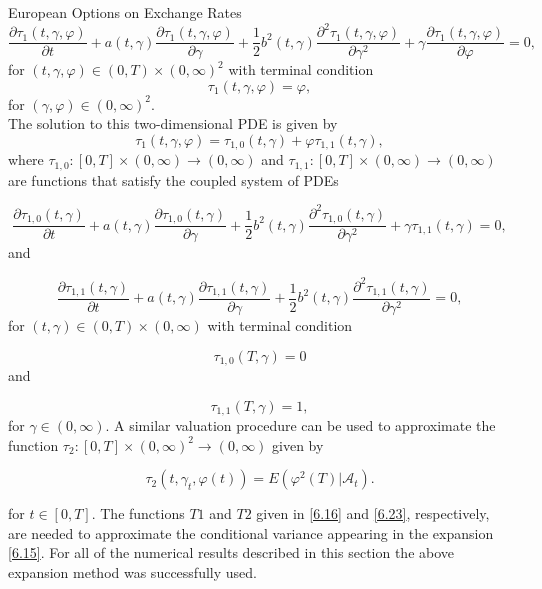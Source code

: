 \documentclass[unknownkeysallowed, compress]{beamer}
\theoremstyle{plain}
\begin{document}
\begin{frame}[allowframebreaks]{European Options on Exchange Rates}
\begin{equation}\label{6.17}
\frac{\partial\tau_1(t,\gamma,\varphi)}{\partial t}+a(t,\gamma) \frac{\partial\tau_1(t,\gamma,\varphi)}{\partial \gamma}+\frac{1}{2}b^2(t,\gamma) \frac{\partial^2\tau_1(t,\gamma,\varphi)}{\partial \gamma^2}+\gamma \frac{\partial\tau_1(t,\gamma,\varphi)}{\partial \varphi} = 0, %
\end{equation}
for $(t,\gamma,\varphi)\in(0,T)\times(0,\infty)^2$ with terminal condition
\begin{equation}\label{6.18}
\tau_1(t,\gamma,\varphi) = \varphi,
\end{equation}
for $(\gamma,\varphi)\in(0,\infty)^2$.\\
The solution to this two-dimensional PDE is given by
$$
\tau_1(t,\gamma,\varphi) = \tau_{1,0}(t,\gamma)+\varphi\tau_{1,1}(t,\gamma),
$$
where $\tau_{1,0}:[0,T]\times (0,\infty)\rightarrow (0,\infty)$ and $\tau_{1,1}:[0,T]\times (0,\infty)\rightarrow (0,\infty)$ are functions that satisfy the coupled system of PDEs

\begin{equation}\label{6.19}
\frac{\partial \tau_{1,0}(t,\gamma)}{\partial t}+a(t,\gamma) \frac{\partial \tau_{1,0}(t,\gamma)}{\partial \gamma}+\frac{1}{2}b^2(t,\gamma) \frac{\partial^2\tau_{1,0}(t,\gamma)}{\partial \gamma^2}+\gamma\tau_{1,1}(t,\gamma) = 0,%
\end{equation}
and 

\begin{equation}\label{4.2.20}
\frac{\partial \tau_{1,1}(t,\gamma)}{\partial t}+a(t,\gamma) \frac{\partial \tau_{1,1}(t,\gamma)}{\partial \gamma}+\frac{1}{2}b^2(t,\gamma) \frac{\partial^2\tau_{1,1}(t,\gamma)}{\partial \gamma^2} = 0,%
\end{equation}
for $(t,\gamma)\in(0,T)\times (0,\infty)$ with terminal condition

\begin{equation}\label{4.2.21}
\tau_{1,0}(T,\gamma) = 0
\end{equation}
and

\begin{equation}\label{4.2.22}
\tau_{1,1}(T,\gamma) = 1,
\end{equation}
for $\gamma\in(0,\infty)$. A similar valuation procedure can be used to approximate the function $\tau_2:[0,T]\times (0,\infty)^2\rightarrow(0,\infty)$ given by

\begin{equation}\label{6.23}
\tau_2(t,\gamma_t,\varphi(t)) = E(\varphi^2(T)|\mathcal{A}_t).
\end{equation}

for $t \in [0,T].$ The functions $T1$ and $T2$ given in \eqref{6.16}  and \eqref{6.23},
respectively, are needed to approximate the conditional variance appearing in
the expansion \eqref{6.15}. For all of the numerical results described in this section
the above expansion method was successfully used.
\end{frame}
\end{document}
